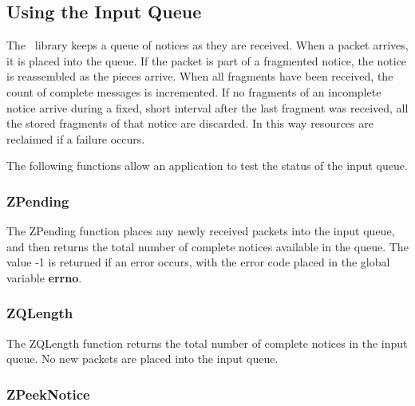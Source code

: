 %
\subsection{Using the Input Queue}
\label{input-queue}

The \Zephyr\ library keeps a queue of notices as they are received.
When a packet arrives, it is placed into the queue.  If the packet is
part of a fragmented notice, the notice is reassembled as the pieces
arrive.  When all fragments have been received, the count of complete
messages is incremented.  If no fragments of an incomplete notice arrive
during a fixed, short interval after the last fragment was received, all the
stored fragments of that notice are discarded.  In this way resources
are reclaimed if a failure occurs.

The following functions allow an application to test the status of the
input queue.

\subsubsection{ZPending}
\label{ZPending}

\etemplate
{}

The ZPending function places any newly received packets into the input
queue, and then returns the total number of complete notices available
in the queue.  The value -1 is returned if an error occurs, with the
error code placed in the global variable {\bf errno}.

\subsubsection{ZQLength}
\label{ZQLength}

\etemplate
{}

The ZQLength function returns the total number of complete notices in
the input queue.  No new packets are placed into the input queue.

\subsubsection{ZPeekNotice}
\label{ZPeekNotice}

